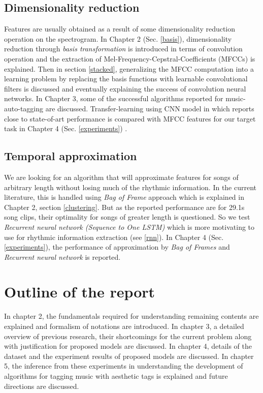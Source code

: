 \subsection{Dimensionality reduction}
Features are usually obtained as a result of some dimensionality reduction operation on the spectrogram. In Chapter 2 (Sec. \ref{basis}), dimensionality reduction through \textit{basis transformation} is introduced in terms of convolution operation and the extraction of Mel-Frequency-Cepstral-Coefficients (MFCCs) is explained. Then in section \ref{stacked}, generalizing the MFCC computation into a learning problem by replacing the basis functions with learnable convolutional filters is discussed and eventually explaining the success of convolution neural networks. In Chapter 3, some of the successful algorithms reported for music-auto-tagging are discussed. Transfer-learning using CNN model in \cite{choi_cnn} which reports close to state-of-art performance is compared with MFCC features for our target task in Chapter 4 (Sec. \ref{experiments}) .
    
\subsection{Temporal approximation}
We are looking for an algorithm that will approximate features for songs of arbitrary length without losing much of the rhythmic information. In the current literature, this is handled using \textit{Bag of Frame} approach which is explained in Chapter 2, section \ref{clustering}. But as the reported performance are for 29.1s song clips, their optimality for songs of greater length is questioned. So we test \textit{Recurrent neural network (Sequence to One LSTM)} which is more motivating to use for rhythmic information extraction (see \ref{rnn}). In Chapter 4 (Sec. \ref{experiments}), the performance of approximation by \textit{Bag of Frames} and \textit{Recurrent neural network} is reported.



\section{Outline of the report}
In chapter 2, the fundamentals required for understanding remaining contents are explained  and formalism of notations are introduced. In chapter 3, a detailed overview of previous research, their shortcomings for the current problem along with justification for proposed models are discussed. In chapter 4, details of the dataset and the experiment results of proposed models are discussed. In chapter 5, the inference from these experiments in understanding the development of algorithms for tagging music with aesthetic tags is explained and future directions are discussed. 






